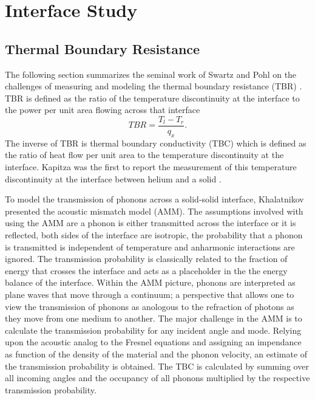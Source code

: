 \chapter{Interface Study}\label{CHP:Interface}

\section{Thermal Boundary Resistance}
The following section summarizes the seminal work of Swartz and Pohl on the challenges of measuring and modeling the thermal boundary resistance (TBR) \cite{RevModPhys.61.605}. TBR is defined as the ratio of the temperature discontinuity at the interface to the power per unit area flowing across that interface
\begin{equation}
TBR=\frac{T_l-T_r}{q_x}.
\end{equation}
The inverse of TBR is thermal boundary conductivity (TBC) which is defined as the ratio of heat flow per unit area to the temperature discontinuity at the interface. Kapitza was the first to report the measurement of this temperature discontinuity at the interface between helium and a solid \cite{kapitza1941study}.

To model the transmission of phonons across a solid-solid interface, Khalatnikov \cite{khalatnikov1973theory} presented the acoustic mismatch model (AMM). The assumptions involved with using the AMM are a phonon is either transmitted across the interface or it is reflected, both sides of the interface are isotropic, the probability that a phonon is transmitted is independent of temperature and anharmonic interactions are ignored. The transmission probability is classically related to the fraction of energy that crosses the interface and acts as a placeholder in the the energy balance of the interface. Within the AMM picture, phonons are interpreted as plane waves that move through a continuum; a perspective that allows one to view the transmission of phonons as anologous to the refraction of photons as they move from one medium to another. The major challenge in the AMM is to calculate the transmission probability for any incident angle and mode. Relying upon the acoustic analog to the Fresnel equations and assigning an impendance as function of the density of the material and the phonon velocity, an estimate of the transmission probability is obtained. The TBC is calculated by summing over all incoming angles and the occupancy of all phonons multiplied by the respective transmission probability.

